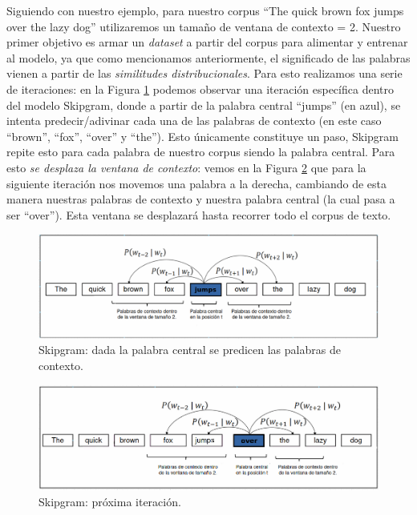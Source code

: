 \documentclass[12pt,a4paper]{article}
\begin{document}
\begin{sloppypar}
Siguiendo con nuestro ejemplo, para nuestro corpus “The quick brown fox jumps over the lazy dog” utilizaremos un tamaño de ventana de contexto = 2. Nuestro primer objetivo es armar un \textit{dataset} a partir del corpus para alimentar y entrenar al modelo, ya que como mencionamos anteriormente, el significado de las palabras vienen a partir de las \textit{similitudes distribucionales}. Para esto realizamos una serie de iteraciones: en la Figura \ref{fig:Imagen_NLP_19} podemos observar una iteración específica dentro del modelo Skipgram, donde a partir de la palabra central “jumps” (en azul), se intenta predecir/adivinar cada una de las palabras de contexto (en este caso “brown”, “fox”, “over” y “the”). Esto únicamente constituye un paso, Skipgram repite esto para cada palabra de nuestro corpus siendo la palabra central. Para esto \textit{se desplaza la ventana de contexto}: vemos en la Figura \ref{fig:Imagen_NLP_20} que para la siguiente iteración nos movemos una palabra a la derecha, cambiando de esta manera nuestras palabras de contexto y nuestra palabra central (la cual pasa a ser “over”). Esta ventana se desplazará hasta recorrer todo el corpus de texto.

\begin{figure}[H]    
 \centering
 \includegraphics[width=1\textwidth]{images/NLP/19.png}
 \captionsetup{justification=centering,margin=3cm}
 \caption{Skipgram: dada la palabra central se predicen las palabras de contexto.}
 \label{fig:Imagen_NLP_19}
\end{figure}

\begin{figure}[H]    
 \centering
 \includegraphics[width=1\textwidth]{images/NLP/20.png}
 \caption{Skipgram: próxima iteración.}
 \label{fig:Imagen_NLP_20}
\end{figure}


\end{sloppypar}
\end{document}
